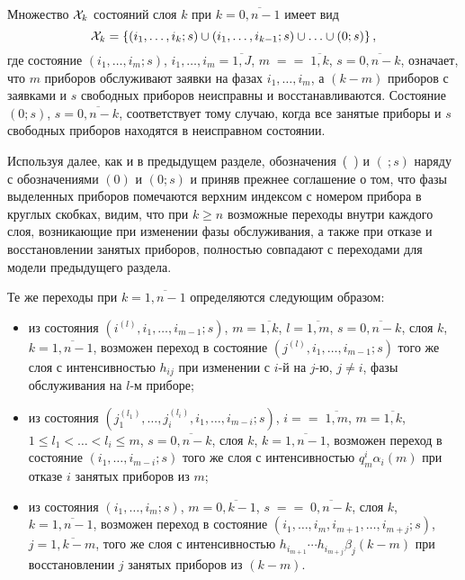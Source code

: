 \begin{multicols}{2}
Множество ${\cal X}_k$ состояний слоя $k$ при $k=\overline{0,n-1}$
имеет вид
$$
{\cal X}_k
=
\{(i_1,\ldots,i_k;s)\cup (i_1,\ldots,i_{k-1};s)\cup\ldots\cup(0;s)\}\,,
$$
где состояние
$(i_1,\ldots,i_m;s)$, $i_1,\ldots,i_m=\overline{1,J}$,
$m\;=$\linebreak $=\;\overline{1,k}$, $s=\overline{0,n-k}$,
означает, что $m$ приборов обслуживают заявки на фазах
$i_1,\ldots,i_m$, а $(k-m)$ приборов с заявками и $s$ свободных
приборов неисправны и восстанавливаются.
Состояние $(0;s)$, $s=\overline{0,n-k}$, соответствует тому
случаю, когда все занятые приборы и $s$ свободных приборов
находятся в неисправном состоянии.

Используя далее, как и в предыдущем разделе, обозначения~(\ ) и
$(\ ;s)$ наряду с обозначениями $(0)$ и $(0;s)$ и приняв
прежнее соглашение о том, что фазы выделенных приборов
помечаются верхним индексом с номером прибора в круглых скобках,
видим, что при $k\ge n$ возможные переходы внут\-ри каждого слоя,
возникающие при изменении фазы обслуживания, а также при отказе и
восстановлении занятых приборов, полностью совпадают с переходами
для модели предыдущего раздела.

Те же переходы при $k=\overline{1,n-1}$ определяются следующим
образом:
\begin{itemize}
\item из состояния $\left (i^{(l)},i_1,\ldots,i_{m-1};s\right )$,
$m=\overline{1,k}$, $l=\overline{1,m}$, $s=\overline{0,n-k}$,
слоя $k$, $k=\overline{1,n-1}$, возможен переход в состояние
$\left (j^{(l)},i_1,\ldots,i_{m-1};s\right )$ того же слоя с интенсивностью $h_{ij}$
при изменении с $i$-й на $j$-ю, $j\ne i$, фазы обслуживания на $l$-м
приборе;
\item
из состояния $\left (j_1^{(l_1)},\ldots,j_i^{(l_i)},i_1,\ldots,i_{m-i};s\right )$,
$i=$\linebreak $=\;\overline{1,m}$, $m=\overline{1,k}$,
$1\le l_1<\ldots<l_i\le m$, $s=\overline{0,n-k}$,
слоя $k$, $k=\overline{1,n-1}$, возможен переход в состояние
$(i_1,\ldots,i_{m-i};s)$ того же слоя с интенсивностью
$q^i_m\alpha_i(m)$ при отказе $i$ занятых приборов из $m$;
\item
из состояния
$(i_1,\ldots, i_m;s)$, $m=\overline{0,k-1}$, $s\;=$\linebreak $=\;\overline{0,n-k}$,
слоя $k$, $k=\overline{1,n-1}$,
возможен переход в состояние
$(i_1,\ldots,i_{m},i_{m+1},\ldots,i_{m+j};s)$, $j=\overline{1,k-m}$,
того же слоя с интенсивностью $h_{i_{m+1}}\cdots h_{i_{m+j}}\beta_j(k-m)$
при восстановлении $j$ занятых приборов из $(k-m)$.
\end{itemize}


\end{multicols}
